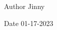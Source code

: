 \begin{DoxyAuthor}{Author}
Jinny 
\end{DoxyAuthor}
\begin{DoxyDate}{Date}
01-\/17-\/2023 
\end{DoxyDate}
